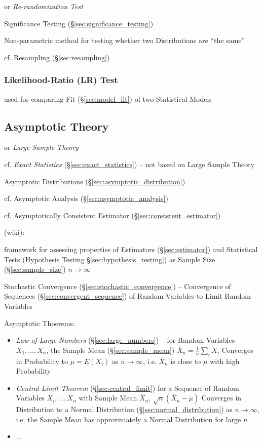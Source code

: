 or \emph{Re-randomization Test}

Significance Testing (\S\ref{sec:significance_testing})

Non-parametric method for testing whether two Distributions are ``the same''

\fist cf. Resampling (\S\ref{sec:resampling})



\subsubsection{Likelihood-Ratio (LR) Test}\label{sec:lr_test}

used for comparing Fit (\S\ref{sec:model_fit}) of two Statistical Models



\subsection{Asymptotic Theory}\label{sec:asymptotic_theory}

or \emph{Large Sample Theory}

\fist cf. \emph{Exact Statistics} (\S\ref{sec:exact_statistics}) -- not based on
Large Sample Theory

\fist Asymptotic Distributions (\S\ref{sec:asymptotic_distribution})

\fist cf. Asymptotic Analysis (\S\ref{sec:asymptotic_analysis})

\fist cf. Asymptotically Consistent Estimator (\S\ref{sec:consistent_estimator})

(wiki):

framework for assessing properties of Estimators (\S\ref{sec:estimator}) and
Statistical Tests (Hypothesis Testing \S\ref{sec:hypothesis_testing}) as Sample
Size (\S\ref{sec:sample_size}) $n \to \infty$

\fist Stochastic Convergence (\S\ref{sec:stochastic_convergence}) -- Convergence
of Sequences (\S\ref{sec:convergent_sequence}) of Random Variables to Limit
Random Variables

Asymptotic Thoerems:
\begin{itemize}
  \item \emph{Law of Large Numbers} (\S\ref{sec:large_numbers}) --
    for Random Variables $X_1, \ldots, X_n$, the Sample Mean
    (\S\ref{sec:sample_mean}) $\overline{X}_n = \frac{1}{n}\sum_i X_i$ Converges
    in Probability to $\mu = E(X_i)$ as $n \to \infty$, i.e.
    $\overline{X}_n$ is close to $\mu$ with high Probability
  \item \emph{Central Limit Theorem} (\S\ref{sec:central_limit})
    for a Sequence of Random Variables $X_i, \ldots, X_n$ with Sample Mean
    $\overline{X}_n$, $\sqrt{n}(\overline{X}_n - \mu)$
    Converges in Distribution to a Normal Distribution
    (\S\ref{sec:normal_distribution}) as $n \to \infty$, i.e. the Sample
    Mean has approximately a Normal Distribution for large $n$
  \item ...
\end{itemize}

